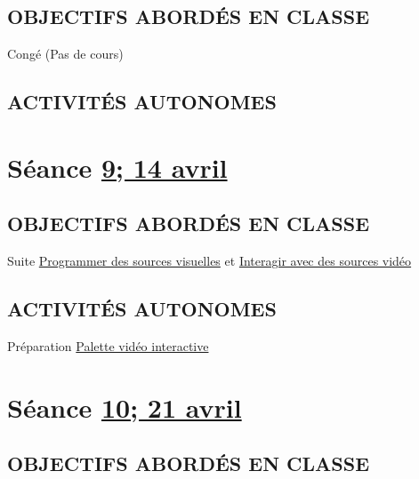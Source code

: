 \documentclass[
  french,
]{book}
\begin{document}
\hypertarget{objectifs-aborduxe9s-en-classe-9}{%
\subsection{OBJECTIFS ABORDÉS EN CLASSE}\label{objectifs-aborduxe9s-en-classe-9}}

Congé (Pas de cours)

\hypertarget{activituxe9s-autonomes-9}{%
\subsection{ACTIVITÉS AUTONOMES}\label{activituxe9s-autonomes-9}}

\hypertarget{semaine_11}{%
\section{\texorpdfstring{Séance \protect\hyperlink{semaine_11}{9; 14 avril}}{Séance 9; 14 avril}}\label{semaine_11}}

\hypertarget{objectifs-aborduxe9s-en-classe-10}{%
\subsection{OBJECTIFS ABORDÉS EN CLASSE}\label{objectifs-aborduxe9s-en-classe-10}}

Suite \protect\hyperlink{programmer}{Programmer des sources visuelles}
et \protect\hyperlink{interagir}{Interagir avec des sources vidéo}

\hypertarget{activituxe9s-autonomes-10}{%
\subsection{ACTIVITÉS AUTONOMES}\label{activituxe9s-autonomes-10}}

Préparation \protect\hyperlink{sommatif_4}{Palette vidéo interactive}

\hypertarget{semaine_12}{%
\section{\texorpdfstring{Séance \protect\hyperlink{semaine_12}{10; 21 avril}}{Séance 10; 21 avril}}\label{semaine_12}}

\hypertarget{objectifs-aborduxe9s-en-classe-11}{%
\subsection{OBJECTIFS ABORDÉS EN CLASSE}\label{objectifs-aborduxe9s-en-classe-11}}
\end{document}
